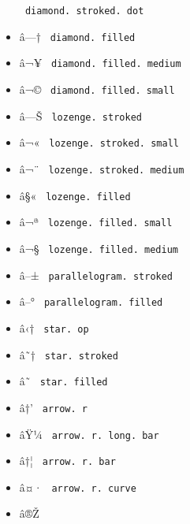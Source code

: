 \begin{itemize}
{  \texttt{\ diamond.\ stroked.\ dot\ }}
\item
  \label{symbol-diamond.filled}{{ â---† }
  \texttt{\ diamond.\ filled\ }}
\item
  \label{symbol-diamond.filled.medium}{{ â¬¥ }
  \texttt{\ diamond.\ filled.\ medium\ }}
\item
  \label{symbol-diamond.filled.small}{{ â¬© }
  \texttt{\ diamond.\ filled.\ small\ }}
\item
  \label{symbol-lozenge.stroked}{{ â---Š }
  \texttt{\ lozenge.\ stroked\ }}
\item
  \label{symbol-lozenge.stroked.small}{{ â¬« }
  \texttt{\ lozenge.\ stroked.\ small\ }}
\item
  \label{symbol-lozenge.stroked.medium}{{ â¬¨ }
  \texttt{\ lozenge.\ stroked.\ medium\ }}
\item
  \label{symbol-lozenge.filled}{{ â§« }
  \texttt{\ lozenge.\ filled\ }}
\item
  \label{symbol-lozenge.filled.small}{{ â¬ª }
  \texttt{\ lozenge.\ filled.\ small\ }}
\item
  \label{symbol-lozenge.filled.medium}{{ â¬§ }
  \texttt{\ lozenge.\ filled.\ medium\ }}
\item
  \label{symbol-parallelogram.stroked}{{ â--± }
  \texttt{\ parallelogram.\ stroked\ }}
\item
  \label{symbol-parallelogram.filled}{{ â--° }
  \texttt{\ parallelogram.\ filled\ }}
\item
  \label{symbol-star.op}{{ â‹† } \texttt{\ star.\ op\ }}
\item
  \label{symbol-star.stroked}{{ â˜† }
  \texttt{\ star.\ stroked\ }}
\item
  \label{symbol-star.filled}{{ â˜ }
  \texttt{\ star.\ filled\ }}
\item
  \label{symbol-arrow.r}{{ â†' } \texttt{\ arrow.\ r\ }}
\item
  \label{symbol-arrow.r.long.bar}{{ âŸ¼ }
  \texttt{\ arrow.\ r.\ long.\ bar\ }}
\item
  \label{symbol-arrow.r.bar}{{ â†¦ }
  \texttt{\ arrow.\ r.\ bar\ }}
\item
  \label{symbol-arrow.r.curve}{{ â¤· }
  \texttt{\ arrow.\ r.\ curve\ }}
\item
  \label{symbol-arrow.r.turn}{{ â®Ž }
}
\end{itemize}
